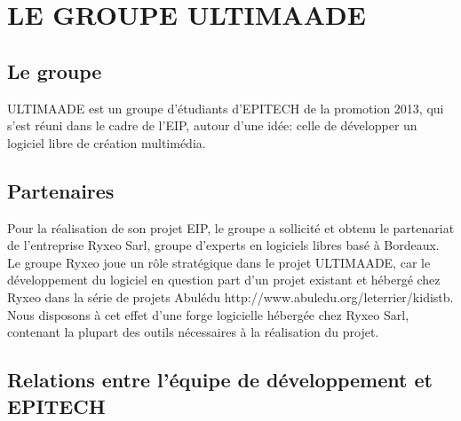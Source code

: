 \documentclass{ultimaade-fr}
\begin{document}
\newpage
 \chapter{LE GROUPE ULTIMAADE}

\section{Le groupe}

ULTIMAADE  est un groupe d'étudiants d’EPITECH de la promotion 2013, qui s'est réuni dans le cadre de l'EIP, autour d'une idée: celle de développer un logiciel libre de création multimédia.

\vspace{20pt}

\section{Partenaires}
Pour la réalisation de son projet EIP, le  groupe a  sollicité et obtenu le  partenariat de l'entreprise Ryxeo Sarl, groupe d'experts en logiciels libres basé  à Bordeaux.
Le groupe Ryxeo joue un rôle stratégique dans le projet ULTIMAADE, car le développement du logiciel en  question part d’un projet existant et hébergé chez Ryxeo dans la série de projets Abulédu http://www.abuledu.org/leterrier/kidistb.
Nous disposons à cet effet d’une forge logicielle hébergée chez Ryxeo Sarl, contenant la plupart des outils nécessaires à la réalisation du projet.

\vspace{20pt}

\section{Relations entre l’équipe de développement et EPITECH}
\end{document}
